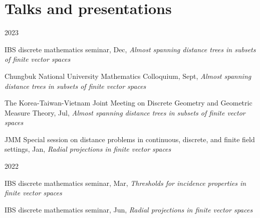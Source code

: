 \documentclass[letterpaper]{article}
\renewenvironment{itemize}{
  \begin{list}{}{
    \setlength{\leftmargin}{1.5em}
  }
}{
  \end{list}
}
\begin{document}
\section*{Talks and presentations}
\begin{itemize}
	\item 2023
	\begin{itemize}
		\item IBS discrete mathematics seminar, Dec, \em{Almost spanning distance trees in subsets of finite vector spaces}
		\item Chungbuk National University Mathematics Colloquium, Sept, {\em Almost spanning distance trees in subsets of finite vector spaces}
		\item The Korea-Taiwan-Vietnam Joint Meeting on Discrete Geometry and Geometric Measure Theory, Jul, {\em Almost spanning distance trees in subsets of finite vector spaces}
		\item JMM Special session on distance problems in continuous, discrete, and finite field settings, Jan, {\em Radial projections in finite vector spaces}
	\end{itemize}
\end{itemize}
\begin{itemize}
	\item 2022
	\begin{itemize}
		\item IBS discrete mathematics seminar, Mar, {\em Thresholds for incidence properties in finite vector spaces}
		\item IBS discrete mathematics seminar, Jun, {\em Radial projections in finite vector spaces}
	\end{itemize}
\end{itemize}
\end{document}
